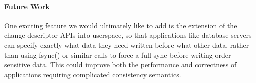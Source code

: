 \preparagraphspacing{}
\paragraph*{Future Work}
\label{sec:future}

One exciting feature we would ultimately like to add is the extension of the
change descriptor APIs into userspace, so that applications like database
servers can specify exactly what data they need written before what other data,
rather than using fsync() or similar calls to force a full sync before writing
order-sensitive data. This could improve both the performance and correctness of
applications requiring complicated consistency semantics.
